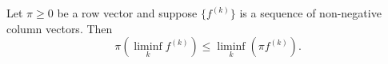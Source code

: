 Let $\pi \geq 0$ be a row vector and suppose $\{f^{(k)}\}$ is a sequence of non-negative column vectors. Then $$\pi(\liminf_k f^{(k)}) \leq \liminf_k (\pi f^{(k)}).$$

